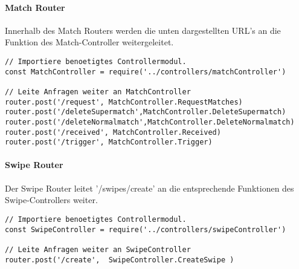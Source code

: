 \paragraph{Match Router}
Innerhalb des Match Routers werden die unten dargestellten URL's an die Funktion des Match-Controller weitergeleitet.

\begin{lstlisting}[caption=Routing in matchRouter.js, label=lst:routingmatch]
// Importiere benoetigtes Controllermodul.
const MatchController = require('../controllers/matchController')

// Leite Anfragen weiter an MatchController
router.post('/request', MatchController.RequestMatches)
router.post('/deleteSupermatch',MatchController.DeleteSupermatch)
router.post('/deleteNormalmatch',MatchController.DeleteNormalmatch)
router.post('/received', MatchController.Received)
router.post('/trigger', MatchController.Trigger)
\end{lstlisting}


\paragraph{Swipe Router}
Der Swipe Router leitet '/swipes/create' an die entsprechende Funktionen des Swipe-Controllers weiter.

\begin{lstlisting}[caption=Routing in swipeRouter.js, label=lst:routingswipe]
// Importiere benoetigtes Controllermodul.
const SwipeController = require('../controllers/swipeController')

// Leite Anfragen weiter an SwipeController
router.post('/create',  SwipeController.CreateSwipe )
\end{lstlisting}








